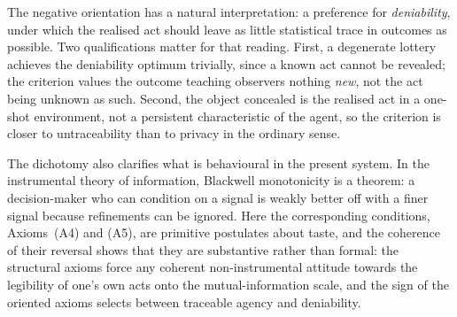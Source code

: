 \documentclass[11pt,a4paper]{article}
\theoremstyle{definition}
\newcommand{\1}{\mathbf 1}
\begin{document}
The negative orientation has a natural interpretation: a preference for \emph{deniability}, under which the realised act
should leave as little statistical trace in outcomes as possible.  Two qualifications matter for that reading.  First,
a degenerate lottery achieves the deniability optimum trivially, since a known act cannot be revealed; the criterion
values the outcome teaching observers nothing \emph{new}, not the act being unknown as such.  Second, the object
concealed is the realised act in a one-shot environment, not a persistent characteristic of the agent, so the criterion
is closer to untraceability than to privacy in the ordinary sense.

The dichotomy also clarifies what is behavioural in the present system.  In the instrumental theory of information,
Blackwell monotonicity is a theorem: a decision-maker who can condition on a signal is weakly better off with a finer
signal because refinements can be ignored.  Here the corresponding conditions, Axioms~\textup{(A4)} and \textup{(A5)},
are primitive postulates about taste, and the coherence of their reversal shows that they are substantive rather than
formal: the structural axioms force any coherent non-instrumental attitude towards the legibility of one's own acts
onto the mutual-information scale, and the sign of the oriented axioms selects between traceable agency and
deniability.
\end{document}
